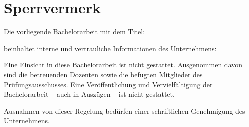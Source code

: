 \chapter*{Sperrvermerk}
\vspace*{0.7cm}

Die vorliegende Bachelorarbeit mit dem Titel:
\vspace*{0.7cm}

\titel


\vspace*{0.7cm}
beinhaltet interne und vertrauliche Informationen des Unternehmens:
\vspace*{0.7cm}

\institutioneins

\vspace*{0.7cm}
Eine Einsicht in diese Bachelorarbeit ist nicht gestattet. Ausgenommen davon sind die betreuenden Dozenten sowie die befugten Mitglieder des Prüfungsausschusses. Eine Veröffentlichung und Vervielfältigung der Bachelorarbeit – auch in Auszügen – ist nicht gestattet.

\vspace*{0.7cm}

Ausnahmen von dieser Regelung bedürfen einer schriftlichen Genehmigung des Unternehmens.

\clearpage
\rohead{\textnormal{\headmark}}
